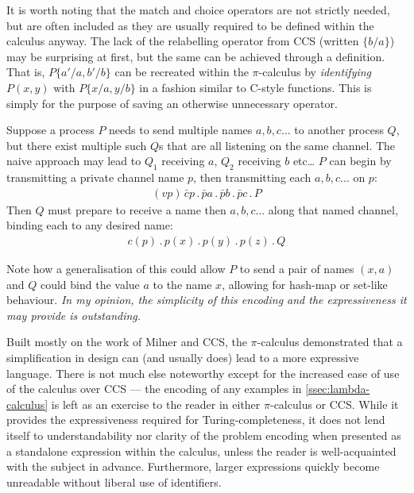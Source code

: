     It is worth noting that the match and choice operators are not strictly needed, but are often included as they are usually required to be defined within the calculus anyway.
    The lack of the relabelling operator from CCS (written $\{b / a\}$) may be surprising at first, but the same can be achieved through a definition.
    That is, $P\{a'/a, b'/b\}$ can be recreated within the $\pi$-calculus by \textit{identifying} $P(x, y)$ with $P\{x/a, y/b\}$ in a fashion similar to C-style functions.
    This is simply for the purpose of saving an otherwise unnecessary operator.


    \begin{example*}
        Suppose a process $P$ needs to send multiple names $a, b, c \ldots$ to another process $Q$, but there exist multiple such $Q$s that are all listening on the same channel.
        The naive approach may lead to $Q_1$ receiving $a$, $Q_2$ receiving $b$ etc\ldots
        $P$ can begin by transmitting a private channel name $p$, then transmitting each $a, b, c \ldots$ on $p$:
        \begin{align*}
            (vp) \, \bar{c} p \, . \, \bar{p} a \, . \, \bar{p} b \, . \, \bar{p} c \, . \, P
        \end{align*}
        Then $Q$ must prepare to receive a name then $a, b, c \ldots$ along that named channel, binding each to any desired name:
        \begin{align*}
            c(p) \, . \, p(x) \, . \, p(y) \, . \, p(z) \, . \, Q
        \end{align*}
    \end{example*}
    Note how a generalisation of this could allow $P$ to send a pair of names $(x, a)$ and $Q$ could bind the value $a$ to the name $x$, allowing for hash-map or set-like behaviour.
    \textit{In my opinion, the simplicity of this encoding and the expressiveness it may provide is outstanding.}


    \begin{remarks}
        Built mostly on the work of Milner and CCS, the $\pi$-calculus demonstrated that a simplification in design can (and usually does) lead to a more expressive language.
        There is not much else noteworthy except for the increased ease of use of the calculus over CCS --- the encoding of any examples in \ref{ssec:lambda-calculus} is left as an exercise to the reader in either $\pi$-calculus or CCS.
        While it provides the expressiveness required for Turing-completeness, it does not lend itself to understandability nor clarity of the problem encoding when presented as a standalone expression within the calculus, unless the reader is well-acquainted with the subject in advance.
        Furthermore, larger expressions quickly become unreadable without liberal use of identifiers.
    \end{remarks}
